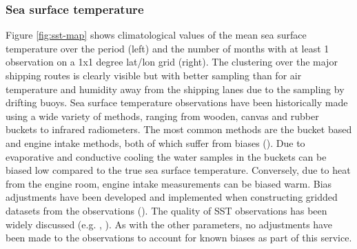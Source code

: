 \subsubsection{Sea surface temperature}
Figure \ref{fig:sst-map} shows climatological values of the mean sea surface temperature over the period \datatimerange{} (left) and the number of months with at least 1 observation on a 1x1 degree lat/lon grid (right).
The clustering over the major shipping routes is clearly visible but with better sampling than for air temperature and humidity away from the shipping lanes due to the sampling by drifting buoys.
Sea surface temperature observations have been historically made using a wide variety of methods, ranging from wooden, canvas and rubber buckets to infrared radiometers. 
The most common methods are the bucket based and engine intake methods, both of which suffer from biases (\cite{Kent2017}). 
Due to evaporative and conductive cooling the water samples in the buckets can be biased low compared to the true sea surface temperature. 
Conversely, due to heat from the engine room, engine intake measurements can be biased warm. 
Bias adjustments have been developed and implemented when constructing gridded datasets from the observations (\cite{Kennedy2011_part2}). 
The quality of SST observations has been widely discussed (e.g. \cite{Kennedy2014}, \cite{Kent2017}).
As with the other parameters, no adjustments have been made to the observations to account for known biases as part of this service.

